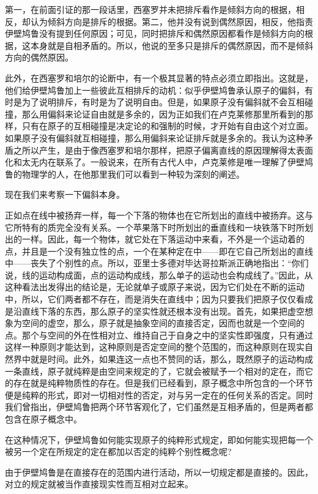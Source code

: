 \documentclass[a4paper,twoside,12pt,AutoFakeBold]{ctexart}
\begin{document}
 第一，在前面引证的那一段话里，西塞罗并未把排斥看作是倾斜方向的根据，相反，却认为倾斜方向是排斥的根据。第二，他并没有说到偶然原因，相反，他指责伊壁鸠鲁没有提到任何原因；可见，同时把排斥和偶然原因都看作是倾斜方向的根据，这本身就是自相矛盾的。所以，他说的至多只是排斥的偶然原因，而不是倾斜方向的偶然原因。

此外，在西塞罗和培尔的论断中，有一个极其显著的特点必须立即指出。这就是，他们给伊壁鸠鲁加上一些彼此互相排斥的动机：似乎伊壁鸠鲁承认原子的偏斜，有时是为了说明排斥，有时是为了说明自由。但是，如果原子没有偏斜就不会互相碰撞，那么用偏斜来论证自由就是多余的，因为正如我们在卢克莱修那里所看到的那样，只有在原子的互相碰撞是决定论的和强制的时候，才开始有自由这个对立面。如果原子没有偏斜就互相碰撞，那么用偏斜来论证排斥就是多余的。我认为这种矛盾之所以产生，是由于像西塞罗和培尔那样，把原子偏离直线的原因理解得太表面化和太无内在联系了。一般说来，在所有古代人中，卢克莱修是唯一理解了伊壁鸠鲁的物理学的人，在他那里我们可以看到一种较为深刻的阐述。

现在我们来考察一下偏斜本身。

正如点在线中被扬弃一样，每一个下落的物体也在它所划出的直线中被扬弃。这与它所特有的质完全没有关系。一个苹果落下时所划出的垂直线和一块铁落下时所划出的一样。因此，每一个物体，就它处在下落运动中来看，不外是一个运动着的点，并且是一个没有独立性的点，一个在某种定在中——即在它自己所划出的直线中——丧失了个别性的点。所以，亚里士多德对毕达哥拉斯派正确地指出：“你们说，线的运动构成面，点的运动构成线，那么单子的运动也会构成线了。”因此，从这种看法出发得出的结论是，无论就单子或原子来说，因为它们处在不断的运动中，所以，它们两者都不存在，而是消失在直线中；因为只要我们把原子仅仅看成是沿直线下落的东西，那么原子的坚实性就还根本没有出现。首先，如果把虚空想象为空间的虚空，那么，原子就是抽象空间的直接否定，因而也就是一个空间的点。那个与空间的外在性相对立、维持自己于自身之中的坚实性即强度，只有通过这样一种原则才能达到，这种原则是否定空间的整个范围的，而这种原则在现实自然界中就是时间。此外，如果连这一点也不赞同的话，那么，既然原子的运动构成一条直线，原子就纯粹是由空间来规定的了，它就会被赋予一个相对的定在，而它的存在就是纯粹物质性的存在。但是我们已经看到，原子概念中所包含的一个环节便是纯粹的形式，即对一切相对性的否定，对与另一定在的任何关系的否定。同时我们曾指出，伊壁鸠鲁把两个环节客观化了，它们虽然是互相矛盾的，但是两者都包含在原子概念中。

在这种情况下，伊壁鸠鲁如何能实现原子的纯粹形式规定，即如何能实现把每一个被另一个定在所规定的定在都加以否定的纯粹个别性概念呢?

由于伊壁鸠鲁是在直接存在的范围内进行活动，所以一切规定都是直接的。因此，对立的规定就被当作直接现实性而互相对立起来。
\end{document}

